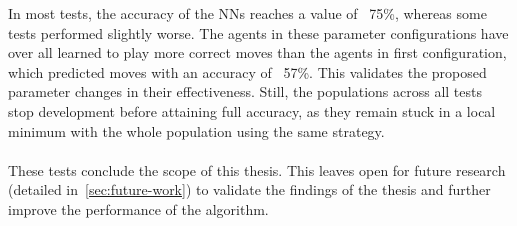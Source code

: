 \begin{figure}[H]
\begin{adjustbox}{valign=c,margin=-5mm 0pt 0pt 0pt}
\begin{minipage}{1.1\textwidth}
\begin{subfigure}[b]{0.45\textwidth}
                \begin{center}
                \end{center}
            \end{subfigure}
        \end{minipage}
    \end{adjustbox}
    \label{fig:performances-3}
\end{figure}

In most tests, the accuracy of the NNs reaches a value of ~75\%, whereas some tests performed slightly worse.
The agents in these parameter configurations have over all learned to play more correct moves than the agents in first configuration, which predicted moves with an accuracy of ~57\%.
This validates the proposed parameter changes in their effectiveness.
Still, the populations across all tests stop development before attaining full accuracy, as they remain stuck in a local minimum with the whole population using the same strategy.
\\ \\
These tests conclude the scope of this thesis.
This leaves open for future research (detailed in~\ref{sec:future-work}) to validate the findings of the thesis and further improve the performance of the algorithm.
